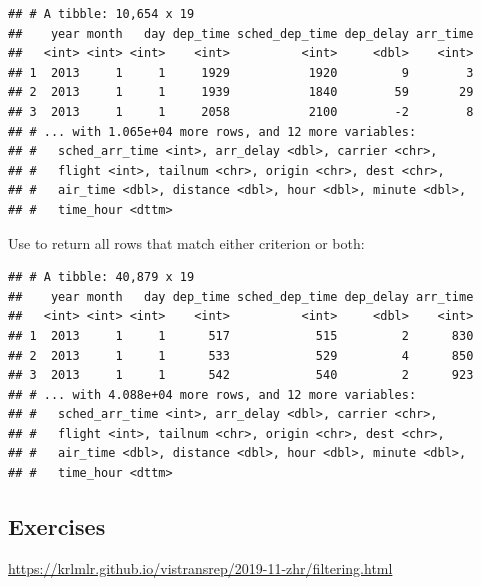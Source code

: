 \documentclass[]{book}
\newenvironment{Shaded}{}{}
\newcommand{\DecValTok}[1]{#1}
\newcommand{\KeywordTok}[1]{\textcolor[rgb]{0.00,0.00,1.00}{#1}}
\newcommand{\NormalTok}[1]{#1}
\newcommand{\OperatorTok}[1]{#1}
\newcommand{\StringTok}[1]{\textcolor[rgb]{0.00,0.50,0.50}{#1}}
\begin{document}
\begin{verbatim}
## # A tibble: 10,654 x 19
##    year month   day dep_time sched_dep_time dep_delay arr_time
##   <int> <int> <int>    <int>          <int>     <dbl>    <int>
## 1  2013     1     1     1929           1920         9        3
## 2  2013     1     1     1939           1840        59       29
## 3  2013     1     1     2058           2100        -2        8
## # ... with 1.065e+04 more rows, and 12 more variables:
## #   sched_arr_time <int>, arr_delay <dbl>, carrier <chr>,
## #   flight <int>, tailnum <chr>, origin <chr>, dest <chr>,
## #   air_time <dbl>, distance <dbl>, hour <dbl>, minute <dbl>,
## #   time_hour <dttm>
\end{verbatim}

Use \texttt{\textbar{}} to return all rows that match either criterion or both:

\begin{Shaded}
\end{Shaded}

\begin{verbatim}
## # A tibble: 40,879 x 19
##    year month   day dep_time sched_dep_time dep_delay arr_time
##   <int> <int> <int>    <int>          <int>     <dbl>    <int>
## 1  2013     1     1      517            515         2      830
## 2  2013     1     1      533            529         4      850
## 3  2013     1     1      542            540         2      923
## # ... with 4.088e+04 more rows, and 12 more variables:
## #   sched_arr_time <int>, arr_delay <dbl>, carrier <chr>,
## #   flight <int>, tailnum <chr>, origin <chr>, dest <chr>,
## #   air_time <dbl>, distance <dbl>, hour <dbl>, minute <dbl>,
## #   time_hour <dttm>
\end{verbatim}

\hypertarget{exercises}{%
\subsection*{Exercises}\label{exercises}}

\url{https://krlmlr.github.io/vistransrep/2019-11-zhr/filtering.html}
\end{document}
